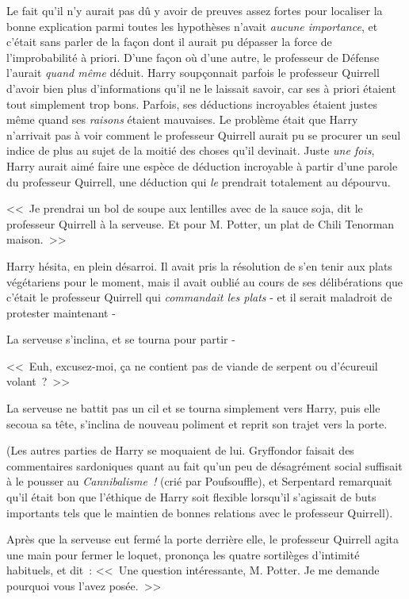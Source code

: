 Le fait qu'il n'y aurait pas dû y avoir de preuves assez fortes pour localiser la bonne explication parmi toutes les hypothèses n'avait \emph{aucune importance}, et c'était sans parler de la façon dont il aurait pu dépasser la force de l'improbabilité à priori. D'une façon où d'une autre, le professeur de Défense l'aurait \emph{quand même} déduit. Harry soupçonnait parfois le professeur Quirrell d'avoir bien plus d'informations qu'il ne le laissait savoir, car ses à priori étaient tout simplement trop bons. Parfois, ses déductions incroyables étaient justes même quand ses \emph{raisons} étaient mauvaises. Le problème était que Harry n'arrivait pas à voir comment le professeur Quirrell aurait pu se procurer un seul indice de plus au sujet de la moitié des choses qu'il devinait. Juste \emph{une fois}, Harry aurait aimé faire une espèce de déduction incroyable à partir d'une parole du professeur Quirrell, une déduction qui \emph{le} prendrait totalement au dépourvu.

\later

<<~Je prendrai un bol de soupe aux lentilles avec de la sauce soja, dit le professeur Quirrell à la serveuse. Et pour M. Potter, un plat de Chili Tenorman maison.~>>

Harry hésita, en plein désarroi. Il avait pris la résolution de s'en tenir aux plats végétariens pour le moment, mais il avait oublié au cours de ses délibérations que c'était le professeur Quirrell qui \emph{commandait les plats} - et il serait maladroit de protester maintenant -

La serveuse s'inclina, et se tourna pour partir -

<<~Euh, excusez-moi, ça ne contient pas de viande de serpent ou d'écureuil volant~?~>>

La serveuse ne battit pas un cil et se tourna simplement vers Harry, puis elle secoua sa tête, s'inclina de nouveau poliment et reprit son trajet vers la porte.

(Les autres parties de Harry se moquaient de lui. Gryffondor faisait des commentaires sardoniques quant au fait qu'un peu de désagrément social suffisait à le pousser au \emph{Cannibalisme~!} (crié par Poufsouffle), et Serpentard remarquait qu'il était bon que l'éthique de Harry soit flexible lorsqu'il s'agissait de buts importants tels que le maintien de bonnes relations avec le professeur Quirrell).

Après que la serveuse eut fermé la porte derrière elle, le professeur Quirrell agita une main pour fermer le loquet, prononça les quatre sortilèges d'intimité habituels, et dit~: <<~Une question intéressante, M. Potter. Je me demande pourquoi vous l'avez posée.~>>

